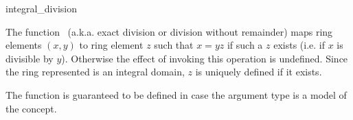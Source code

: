\begin{ccRefFunction}{integral_division}

\ccDefinition

The function \ccRefName\ (a.k.a. exact division or division without remainder) maps 
ring elements $(x,y)$ to ring element $z$ such that $x = yz$ if such a $z$ 
exists (i.e. if $x$ is divisible by $y$). Otherwise the effect of invoking 
this operation is undefined. Since the ring represented is an integral domain, 
$z$ is uniquely defined if it exists. 

The function is guaranteed to be defined in case the argument type 
is a model of the  concept.


{}

\ccSeeAlso

\\
\\

\end{ccRefFunction}
